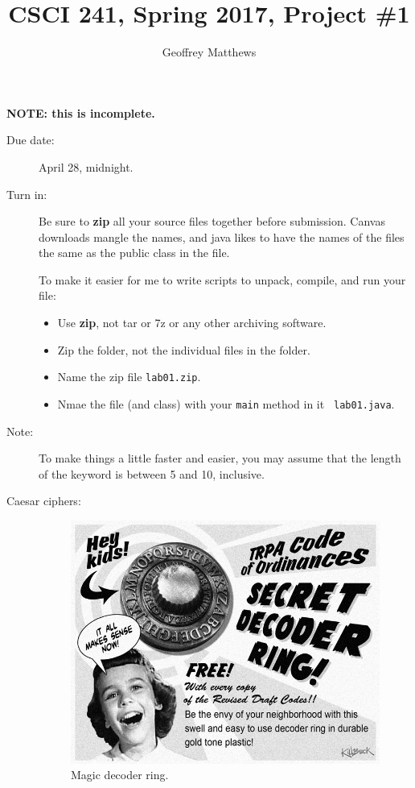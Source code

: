 \documentclass{article}
\title{CSCI 241, Spring 2017, Project \#1}
\author{Geoffrey Matthews}
\begin{document}
\maketitle

\centerline{\bf NOTE:  this is incomplete.}

\begin{description}
\item[Due date:]  April 28, midnight.

\item[Turn in:] Be sure to {\bf zip} all your source files together
  before submission.  Canvas downloads mangle the names, and java
  likes to have the names of the files the same as the public class in
  the file.

  To make
  it easier for me to write scripts to unpack, compile, and run your
  file:
  \begin{itemize}
    \item
      Use {\bf zip}, not tar or 7z or any other archiving software.
      \item Zip the folder, not the individual  files in the folder.
      \item Name the zip file {\tt lab01.zip}.
\item
  Nmae the file (and class) with your {\tt main} method in it {\tt
    lab01.java}. 
  \end{itemize}
  
\item[Note:] To make things a little faster and easier, you may assume
  that the length of the keyword is between 5 and 10, inclusive.

\item[Caesar ciphers:]

  \begin{figure}
  \centerline{\includegraphics[scale=0.25]{secretdecoderring.jpg}  }
  \caption{Magic decoder ring.}
  \label{magicring}
  \end{figure}
  

\end{description}
\end{document}

